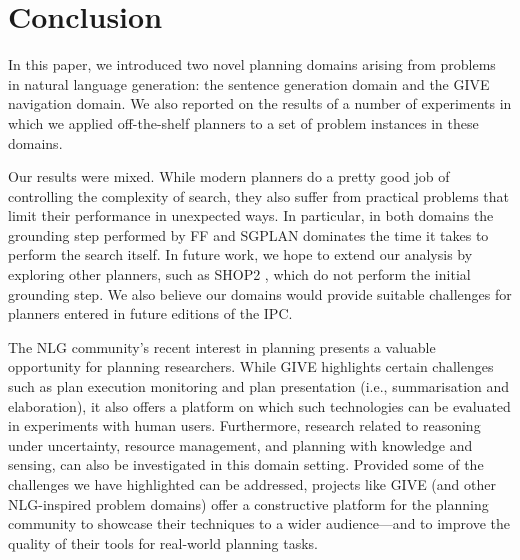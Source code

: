 \section{Conclusion} \label{sec:conclusion}

In this paper, we introduced two novel planning domains arising from
problems in natural language generation: the sentence generation
domain and the GIVE navigation domain. We also reported on the results
of a number of experiments in which we applied off-the-shelf planners
to a set of problem instances in these domains.

Our results were mixed. While modern planners do a pretty good job of
controlling the complexity of search, they also suffer from practical
problems that limit their performance in unexpected ways. In particular, in
both domains the grounding step performed by FF and SGPLAN dominates the
time it takes to perform the search itself. In future work, we hope to
extend our analysis by exploring other planners, such as SHOP2
\cite{DBLP:journals/jair/NauAIKMWY03}, which do not perform the initial
grounding step. We also believe our domains would provide suitable
challenges for planners entered in future editions of the IPC.

The NLG community's recent interest in planning presents a valuable
opportunity for planning researchers.  While GIVE highlights
certain challenges such as plan execution monitoring and plan presentation
(i.e., summarisation and elaboration), it also offers a platform on which
such technologies can be evaluated in experiments with human users.
Furthermore, research related to reasoning under uncertainty, resource
management, and planning with knowledge and sensing, can also be
investigated in this domain setting. Provided some of the challenges we
have highlighted can be addressed, projects like GIVE (and other
NLG-inspired problem domains) offer a constructive platform for the
planning community to showcase their techniques to a wider audience---and
to improve the quality of their tools for real-world planning tasks. 


